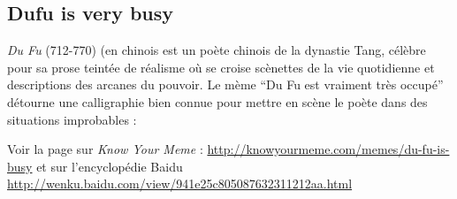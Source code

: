 \subsection*{Dufu is very busy}

\textit{Du Fu} (712-770) (en chinois  est un poète chinois de la dynastie Tang, célèbre pour sa prose teintée de réalisme où se croise scènettes de la vie quotidienne et descriptions des arcanes du pouvoir. Le mème ``Du Fu est vraiment très occupé''  détourne une calligraphie bien connue pour mettre en scène le poète dans des situations improbables : 

Voir la page sur \textit{Know Your Meme} :
\url{http://knowyourmeme.com/memes/du-fu-is-busy}
et sur l'encyclopédie Baidu
\url{http://wenku.baidu.com/view/941e25c805087632311212aa.html}

